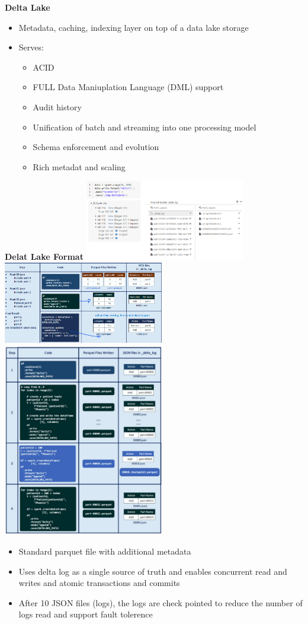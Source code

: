 \documentclass[10pt, landscape]{article}
\begin{document}
\begin{multicols}{4}
\textbf{Delta Lake}
\begin{itemize}
  \item Metadata, caching, indexing layer on top of a data lake storage 
  \item Serves:
  \begin{itemize}
    \item ACID 
    \item FULL Data Maniuplation Language (DML) support 
    \item Audit history 
    \item Unification of batch and streaming into one processing model
    \item Schema enforcement and evolution 
    \item Rich metadat and scaling
  \end{itemize}
\end{itemize}

\textbf{Delat Lake Format}
\includegraphics*[width=7cm]{delta_log.png}
\includegraphics*[width=7cm]{parquet1.png}
\includegraphics*[width=7cm]{parquet2.png}
\begin{itemize}
  \item Standard parquet file with additional metadata 
  \item Uses delta log as a single source of truth and enables concurrent read and writes and atomic transactions and commits 
  \item After 10 JSON files (logs), the logs are check pointed to reduce the number of logs read and support fault tolerence
\end{itemize}



\end{multicols}
\end{document}

